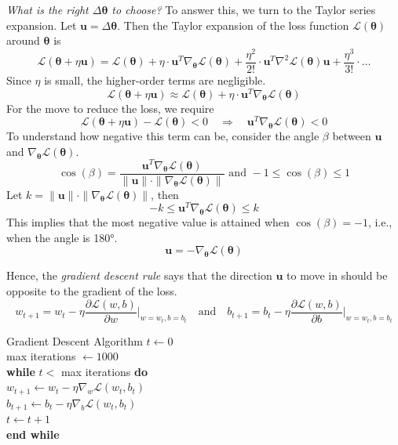 \textit{What is the right \( \Delta \boldsymbol{\theta} \) to choose?}
To answer this, we turn to the Taylor series expansion. Let \( \boldsymbol{u} = \Delta \boldsymbol{\theta} \). Then the Taylor expansion of the loss function \( \mathcal{L}(\boldsymbol{\theta}) \) around \( \boldsymbol{\theta} \) is 
\[
\mathcal{L}(\boldsymbol{\theta} + \eta \boldsymbol{u}) = \mathcal{L}(\boldsymbol{\theta}) + \eta \cdot \boldsymbol{u}^T \nabla_{\boldsymbol{\theta}} \mathcal{L}(\boldsymbol{\theta}) + \frac{\eta^2}{2!} \cdot \boldsymbol{u}^T \nabla^2 \mathcal{L}(\boldsymbol{\theta}) \boldsymbol{u} + \frac{\eta^3}{3!} \cdot \ldots
\]
Since \( \eta \) is small, the higher-order terms are negligible.
\[
\mathcal{L}(\boldsymbol{\theta} + \eta \boldsymbol{u}) \approx \mathcal{L}(\boldsymbol{\theta}) + \eta \cdot \boldsymbol{u}^T \nabla_{\boldsymbol{\theta}} \mathcal{L}(\boldsymbol{\theta})
\]
For the move to reduce the loss, we require
\[
\mathcal{L}(\boldsymbol{\theta} + \eta \boldsymbol{u}) - \mathcal{L}(\boldsymbol{\theta}) < 0 \quad \Rightarrow \quad \boldsymbol{u}^T \nabla_{\boldsymbol{\theta}} \mathcal{L}(\boldsymbol{\theta}) < 0
\]
To understand how negative this term can be, consider the angle \( \beta \) between \( \boldsymbol{u} \) and \( \nabla_{\boldsymbol{\theta}} \mathcal{L}(\boldsymbol{\theta}) \). 
\[
\cos(\beta) = \frac{\boldsymbol{u}^T \nabla_{\boldsymbol{\theta}} \mathcal{L}(\boldsymbol{\theta})}{\|\boldsymbol{u}\| \cdot \| \nabla_{\boldsymbol{\theta}} \mathcal{L}(\boldsymbol{\theta}) \|} \text{ and } -1 \leq \cos(\beta) \leq 1
\]
Let \( k = \|\boldsymbol{u}\| \cdot \|\nabla_{\boldsymbol{\theta}} \mathcal{L}(\boldsymbol{\theta})\| \), then
\[
-k \leq \boldsymbol{u}^T \nabla_{\boldsymbol{\theta}} \mathcal{L}(\boldsymbol{\theta}) \leq k
\]
This implies that the most negative value is attained when \( \cos(\beta) = -1 \), i.e., when the angle is 180°.
\[
\boldsymbol{u} = -\nabla_{\boldsymbol{\theta}} \mathcal{L}(\boldsymbol{\theta})
\]

Hence, the \textit{gradient descent rule} says that the direction \( \boldsymbol{u} \) to move in should be opposite to the gradient of the loss.
\[
w_{t+1} = w_t - \eta \frac{\partial \mathcal{L}(w, b)}{\partial w}\bigg|_{w = w_t, b = b_t}
\quad \text{and} \quad
b_{t+1} = b_t - \eta \frac{\partial \mathcal{L}(w, b)}{\partial b}\bigg|_{w = w_t, b = b_t}
\]

\begin{algobox}{Gradient Descent Algorithm}
\( t \gets 0 \) \\
max iterations \( \gets 1000 \) \\
\textbf{while} \( t < \) max iterations \textbf{do} \\
\hspace*{1em} \( w_{t+1} \gets w_t - \eta \nabla_w \mathcal{L}(w_t, b_t) \) \\
\hspace*{1em} \( b_{t+1} \gets b_t - \eta \nabla_b \mathcal{L}(w_t, b_t) \) \\
\hspace*{1em} \( t \gets t + 1 \) \\
\textbf{end while}
\end{algobox}

